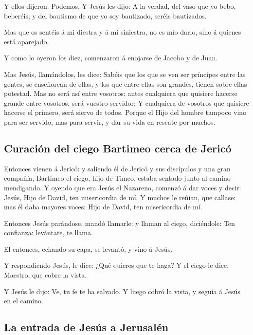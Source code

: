  Y ellos dijeron: Podemos. Y Jesús les dijo: A la verdad,
del vaso que yo bebo, beberéis; y del bautismo de que yo soy bautizado,
seréis bautizados.

 Mas que os sentéis á mi diestra y á mi siniestra, no es
mío darlo, sino á quienes está aparejado.

 Y como lo oyeron los diez, comenzaron á enojarse de
Jacobo y de Juan.

 Mas Jesús, llamándolos, les dice: Sabéis que los que se
ven ser príncipes entre las gentes, se enseñorean de ellas, y los que
entre ellas son grandes, tienen sobre ellas potestad. 
Mas no será así entre vosotros: antes cualquiera que quisiere hacerse
grande entre vosotros, será vuestro servidor;  Y
cualquiera de vosotros que quisiere hacerse el primero, será siervo de
todos.  Porque el Hijo del hombre tampoco vino para ser
servido, mas para servir, y dar su vida en rescate por muchos.

\hypertarget{curaciuxf3n-del-ciego-bartimeo-cerca-de-jericuxf3}{%
\subsection{Curación del ciego Bartimeo cerca de
Jericó}\label{curaciuxf3n-del-ciego-bartimeo-cerca-de-jericuxf3}}

 Entonces vienen á Jericó: y saliendo él de Jericó y sus
discípulos y una gran compañía, Bartimeo el ciego, hijo de Timeo, estaba
sentado junto al camino mendigando.  Y oyendo que era
Jesús el Nazareno, comenzó á dar voces y decir: Jesús, Hijo de David,
ten misericordia de mí.  Y muchos le reñían, que callase:
mas él daba mayores voces: Hijo de David, ten misericordia de mí.

 Entonces Jesús parándose, mandó llamarle: y llaman al
ciego, diciéndole: Ten confianza: levántate, te llama.

 El entonces, echando su capa, se levantó, y vino á
Jesús.

 Y respondiendo Jesús, le dice: ¿Qué quieres que te haga?
Y el ciego le dice: Maestro, que cobre la vista.

 Y Jesús le dijo: Ve, tu fe te ha salvado. Y luego cobró
la vista, y seguía á Jesús en el camino.

\hypertarget{la-entrada-de-jesuxfas-a-jerusaluxe9n}{%
\subsection{La entrada de Jesús a
Jerusalén}\label{la-entrada-de-jesuxfas-a-jerusaluxe9n}}

